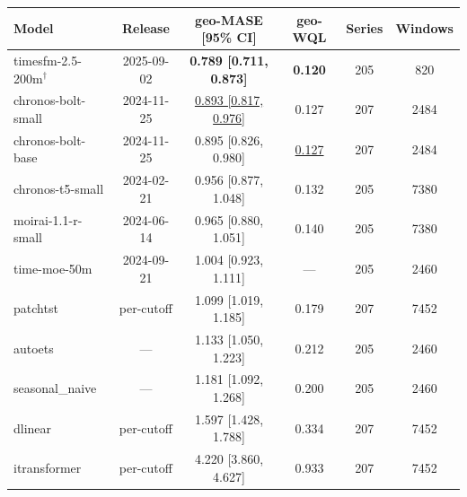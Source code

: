 \begin{tabular}{lccccc}
\toprule
Model & Release & geo-MASE [95\% CI] & geo-WQL & Series & Windows \\
\midrule
timesfm-2.5-200m$^{\dagger}$ & 2025-09-02 & \textbf{0.789 [0.711, 0.873]} & \textbf{0.120} & 205 & 820 \\
chronos-bolt-small & 2024-11-25 & \underline{0.893 [0.817, 0.976]} & 0.127 & 207 & 2484 \\
chronos-bolt-base & 2024-11-25 & 0.895 [0.826, 0.980] & \underline{0.127} & 207 & 2484 \\
chronos-t5-small & 2024-02-21 & 0.956 [0.877, 1.048] & 0.132 & 205 & 7380 \\
moirai-1.1-r-small & 2024-06-14 & 0.965 [0.880, 1.051] & 0.140 & 205 & 7380 \\
time-moe-50m & 2024-09-21 & 1.004 [0.923, 1.111] & --- & 205 & 2460 \\
patchtst & per-cutoff & 1.099 [1.019, 1.185] & 0.179 & 207 & 7452 \\
autoets & --- & 1.133 [1.050, 1.223] & 0.212 & 205 & 2460 \\
seasonal\_naive & --- & 1.181 [1.092, 1.268] & 0.200 & 205 & 2460 \\
dlinear & per-cutoff & 1.597 [1.428, 1.788] & 0.334 & 207 & 7452 \\
itransformer & per-cutoff & 4.220 [3.860, 4.627] & 0.933 & 207 & 7452 \\
\bottomrule
\end{tabular}
